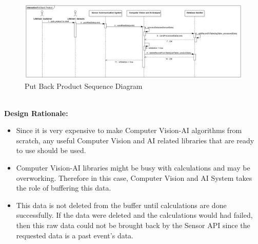 \documentclass[11pt]{article}
\begin{document}
    \begin{center}
        \begin{figure}[H]
            \includegraphics[width=\linewidth]{Images/PutBackProductSeq.png} %
            \caption{Put Back Product Sequence Diagram}
            \label{pbpsd}
        \end{figure}
    \end{center}

    \textbf{\\Design Rationale:}
    \begin{itemize}
       \item Since it is very expensive to make Computer Vision-AI algorithms from scratch, any useful Computer Vision and AI related libraries that are ready to use should be used.
       \item Computer Vision-AI libraries might be busy with calculations and may be overworking. Therefore in this case, Computer Vision and AI System takes the role of buffering this data.
       \item This data is not deleted from the buffer until calculations are done successfully. If the data were deleted and the calculations would had failed, then this raw data could not be brought 
       back by the Sensor API since the requested data is a past event's data. 
    \end{itemize}

 
\end{document}
